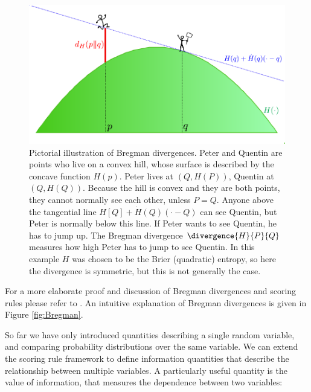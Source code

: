 \begin{figure}
\begin{center}
	\includegraphics[width=0.8\columnwidth]{figs/embeddings/Bregman}
\end{center}
\caption{Pictorial illustration of Bregman divergences. Peter and Quentin are points who live on a convex hill, whose surface is described by the concave function $H(p)$. Peter lives at $(Q,H(P))$, Quentin at $(Q,H(Q))$. Because the hill is convex and they are both points, they cannot normally see each other, unless $P=Q$. Anyone above the tangential line $H[Q] + \dot{H}(Q)(\cdot-Q)$ can see Quentin, but Peter is normally below this line. If Peter wants to see Quentin, he has to jump up. The Bregman divergence $\divergence{H}{P}{Q}$ measures how high Peter has to jump to see Quentin. In this example $H$ was chosen to be the Brier (quadratic) entropy, so here the divergence is symmetric, but this is not generally the case.}
\end{figure}

For a more elaborate proof and discussion of Bregman divergences and scoring rules please refer to \citep{Amari2010,Dawid2007}. An intuitive explanation of Bregman divergences is given in Figure \ref{fig:Bregman}.

So far we have only introduced quantities describing a single random variable, and comparing probability distributions over the same variable. We can extend the scoring rule framework to define information quantities that describe the relationship between multiple variables. A particularly useful quantity is the value of information, that measures the dependence between two variables:

